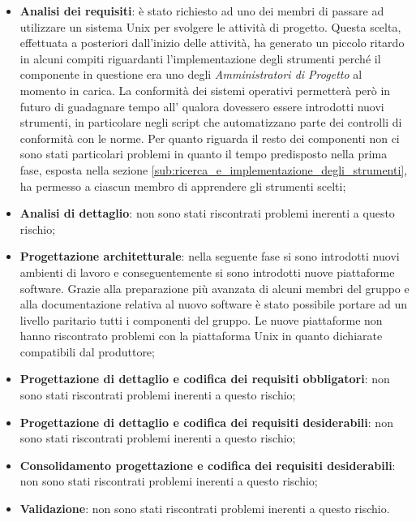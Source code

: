 			\begin{itemize}
				\item \textbf{Analisi dei requisiti}: è stato richiesto ad uno dei membri di passare ad utilizzare un sistema Unix per svolgere le attività di progetto. Questa scelta, effettuata a posteriori dall'inizio delle attività, ha generato un piccolo ritardo in alcuni compiti riguardanti l'implementazione degli strumenti perché il componente in questione era uno degli \emph{Amministratori di Progetto} al momento in carica. \newline
				La conformità dei sistemi operativi permetterà però in futuro di guadagnare tempo all'\roleAdministrator{} qualora dovessero essere introdotti nuovi strumenti, in particolare negli script che automatizzano parte dei controlli di conformità con le norme. \newline
				Per quanto riguarda il resto dei componenti non ci sono stati particolari problemi in quanto il tempo predisposto nella prima fase, esposta nella sezione \ref{sub:ricerca_e_implementazione_degli_strumenti}, ha permesso a ciascun membro di apprendere gli strumenti scelti;
				\item \textbf{Analisi di dettaglio}: non sono stati riscontrati problemi inerenti a questo rischio;
				\item \textbf{Progettazione architetturale}: nella seguente fase si sono introdotti nuovi ambienti di lavoro e conseguentemente si sono introdotti nuove piattaforme software. Grazie alla preparazione più avanzata di alcuni membri del gruppo e alla documentazione relativa al nuovo software è stato possibile portare ad un livello paritario tutti i componenti del gruppo. Le nuove piattaforme non hanno riscontrato problemi con la piattaforma Unix in quanto dichiarate compatibili dal produttore;
				\item \textbf{Progettazione di dettaglio e codifica dei requisiti obbligatori}: non sono stati riscontrati problemi inerenti a questo rischio;
				\item \textbf{Progettazione di dettaglio e codifica dei requisiti desiderabili}: non sono stati riscontrati problemi inerenti a questo rischio;
				\item \textbf{Consolidamento progettazione e codifica dei requisiti desiderabili}: non sono stati riscontrati problemi inerenti a questo rischio;
				\item \textbf{Validazione}: non sono stati riscontrati problemi inerenti a questo rischio.
			\end{itemize}

